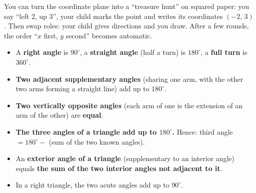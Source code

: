 \begin{parentbox}
You can turn the coordinate plane into a ``treasure hunt'' on squared paper: you say ``left 2, up 3'', your child marks the point and writes its coordinates $(-2,\,3)$. Then swap roles: your child gives directions and you draw. After a few rounds, the order ``$x$ first, $y$ second'' becomes automatic.
\end{parentbox}

\begin{knowbox}
\begin{itemize}[leftmargin=1.3em,itemsep=2pt,topsep=2pt]
  \item A \textbf{right angle} is $90^\circ$, a \textbf{straight angle} (half a turn) is $180^\circ$, a \textbf{full turn} is $360^\circ$.
  \item \textbf{Two adjacent supplementary angles} (sharing one arm, with the other two arms forming a straight line) add up to $180^\circ$.
  \item \textbf{Two vertically opposite angles} (each arm of one is the extension of an arm of the other) are \textbf{equal}.
  \item \textbf{The three angles of a triangle add up to $180^\circ$.} Hence: third angle $=180^\circ-$ (sum of the two known angles).
  \item An \textbf{exterior angle of a triangle} (supplementary to an interior angle) equals \textbf{the sum of the two interior angles not adjacent to it}.
  \item In a right triangle, the two acute angles add up to $90^\circ$.
\end{itemize}
\end{knowbox}

